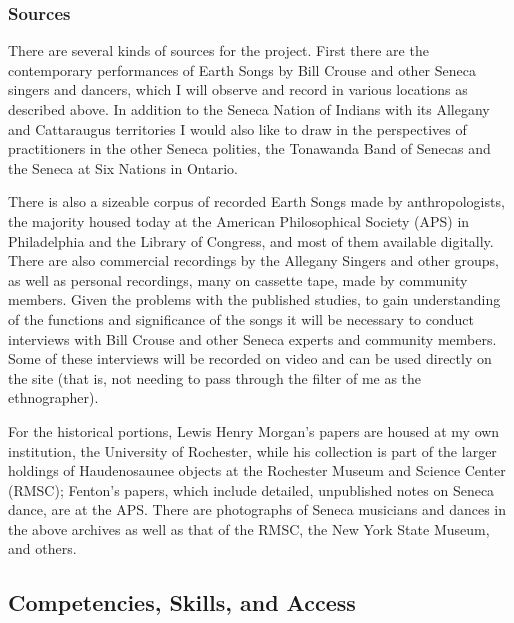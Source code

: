 \documentclass{neh}
\begin{document}
\subsubsection{Sources}

There are several kinds of sources for the project.
First there are the contemporary performances of Earth Songs by Bill Crouse
and other Seneca singers and dancers, which I will observe and record in
various locations as described above.
In addition to the Seneca Nation of Indians with its Allegany and Cattaraugus
territories I would also like to draw in the perspectives of practitioners in
the other Seneca polities, the Tonawanda Band of Senecas and the Seneca at Six
Nations in Ontario.

There is also a sizeable corpus of recorded Earth Songs made by
anthropologists, the majority housed today at the American Philosophical
Society (APS) in Philadelphia and the Library of Congress, and most of them
available digitally.
There are also commercial recordings by the Allegany Singers and other groups,
as well as personal recordings, many on cassette tape, made by community
members.
Given the problems with the published studies, to gain understanding of the
functions and significance of the songs it will be necessary to conduct
interviews with Bill Crouse and other Seneca experts and community members.
Some of these interviews will be recorded on video and can be used directly on
the site (that is, not needing to pass through the filter of me as the
ethnographer). 

For the historical portions, Lewis Henry Morgan's papers are housed at my own
institution, the University of Rochester, while his collection is part of the
larger holdings of Haudenosaunee objects at the Rochester Museum and Science
Center (RMSC); Fenton's papers, which include detailed, unpublished notes on
Seneca dance, are at the APS.
There are photographs of Seneca musicians and dances in the above archives as
well as that of the RMSC, the New York State Museum, and others.


\subsection{Competencies, Skills, and Access}
\end{document}
